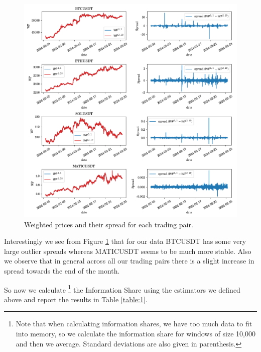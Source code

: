 \begin{figure}[htpb]
    \centering
    \includegraphics[width=1.0\textwidth]{./images/weighted_prices.png}
    \caption{Weighted prices and their spread for each trading pair.}
    \label{spread}
\end{figure}

Interestingly we see from Figure \ref{spread} that for our data BTCUSDT
has some very large outlier spreads whereas MATICUSDT seems to be much more stable.
Also we observe that in general across all our trading pairs there is a slight increase
in spread towards the end of the month.


So now we calculate \footnote{Note that when calculating information shares, we have too much data to fit
into memory, so we calculate the information share for windows of size 10,000 and then
we average. Standard deviations are also given in parenthesis.} the Information Share using the estimators we defined above
and report the results in Table \ref{table:1}.

